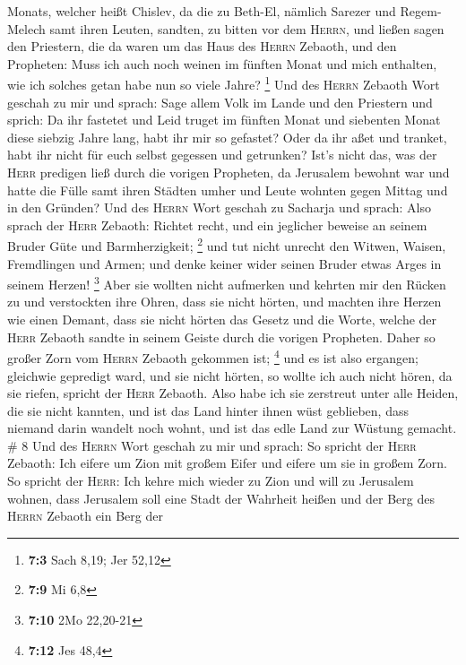 Monats, welcher heißt Chislev,  da die zu Beth-El, nämlich
Sarezer und Regem-Melech samt ihren Leuten, sandten, zu bitten vor dem
\textsc{Herrn},  und ließen sagen den Priestern, die da
waren um das Haus des \textsc{Herrn} Zebaoth, und den Propheten: Muss
ich auch noch weinen im fünften Monat und mich enthalten, wie ich
solches getan habe nun so viele Jahre? \footnote{\textbf{7:3} Sach 8,19;
  Jer 52,12}  Und des \textsc{Herrn} Zebaoth Wort geschah
zu mir und sprach:  Sage allem Volk im Lande und den
Priestern und sprich: Da ihr fastetet und Leid truget im fünften Monat
und siebenten Monat diese siebzig Jahre lang, habt ihr mir so gefastet?
 Oder da ihr aßet und tranket, habt ihr nicht für euch
selbst gegessen und getrunken?  Ist's nicht das, was der
\textsc{Herr} predigen ließ durch die vorigen Propheten, da Jerusalem
bewohnt war und hatte die Fülle samt ihren Städten umher und Leute
wohnten gegen Mittag und in den Gründen?  Und des
\textsc{Herrn} Wort geschah zu Sacharja und sprach:  Also
sprach der \textsc{Herr} Zebaoth: Richtet recht, und ein jeglicher
beweise an seinem Bruder Güte und Barmherzigkeit; \footnote{\textbf{7:9}
  Mi 6,8}  und tut nicht unrecht den Witwen, Waisen,
Fremdlingen und Armen; und denke keiner wider seinen Bruder etwas Arges
in seinem Herzen! \footnote{\textbf{7:10} 2Mo 22,20-21} 
Aber sie wollten nicht aufmerken und kehrten mir den Rücken zu und
verstockten ihre Ohren, dass sie nicht hörten,  und
machten ihre Herzen wie einen Demant, dass sie nicht hörten das Gesetz
und die Worte, welche der \textsc{Herr} Zebaoth sandte in seinem Geiste
durch die vorigen Propheten. Daher so großer Zorn vom \textsc{Herrn}
Zebaoth gekommen ist; \footnote{\textbf{7:12} Jes 48,4} 
und es ist also ergangen; gleichwie gepredigt ward, und sie nicht
hörten, so wollte ich auch nicht hören, da sie riefen, spricht der
\textsc{Herr} Zebaoth.  Also habe ich sie zerstreut unter
alle Heiden, die sie nicht kannten, und ist das Land hinter ihnen wüst
geblieben, dass niemand darin wandelt noch wohnt, und ist das edle Land
zur Wüstung gemacht. \# 8  Und des \textsc{Herrn} Wort
geschah zu mir und sprach:  So spricht der \textsc{Herr}
Zebaoth: Ich eifere um Zion mit großem Eifer und eifere um sie in großem
Zorn.  So spricht der \textsc{Herr}: Ich kehre mich wieder
zu Zion und will zu Jerusalem wohnen, dass Jerusalem soll eine Stadt der
Wahrheit heißen und der Berg des \textsc{Herrn} Zebaoth ein Berg der
